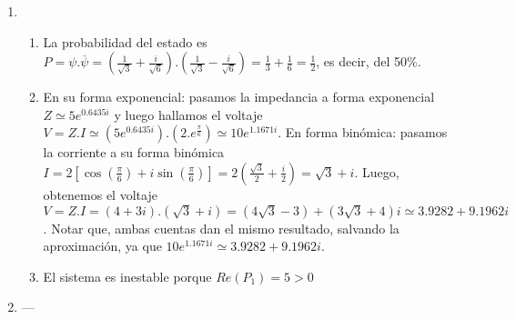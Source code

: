 \documentclass[a4paper]{article}
\newcommand{\exercise}{\item}
\newcommand{\df}[2]{\displaystyle\frac{#1}{#2}}
\newcommand{\conj}[1]{\overline{#1}}
\newcommand{\cis}[1]{\left[\cos\left({#1}\right)+i\sin\left({#1}\right)\right]}
\begin{document}
\begin{enumerate}
\begin{enumerate} [label=(\alph*)]
\item ---		\item Primero rotamos los puntos $90^{\circ}$ en sentido antihorario con la operación $w=z.e^{\frac{\pi}{2}i}=z.i$. Luego expandimos los puntos obtenidos con la operación $u=2.z.i=2i.z$. Los nuevos puntos obtenidos serán $a=-2$, $b=2i-2$, $c=0$ y $d=2i$.
		\item Notar que $Arg(z) = 60^{\circ}$ y queremos rotarlo para que esté orientado hace el eje $-x$, por lo que deberíamos rotarlo $120^{\circ}=\df{2}{3}\pi$. Para rotarlo debemos hacer la operación $w=z.e^{\frac{2\pi}{3}i} = \left(2e^{\frac{\pi}{3}i}\right).e^{\frac{2\pi}{3}i} =2e^{\pi i}=-2+0i$, que está exactamente al centro de la región pedida.
		\item Podemos escalar al complejo con la operación $u=kz=k+4ki$. Si queremos que se cumpla la condición límite $Im(u) = 2 - Re(u)$ debe pasar que $4k=2-k$, es decir, $k=2/5$. Por lo tanto, podremos utilizar valores de $k$ entre $0$ y $\df{2}{5}$. Se sugiere elegir algunos valores de $k$ para escalar al complejo y graficarlo junto con la región pedida.
		\item Notar que $Arg(3+i) \simeq 18.43^{\circ}$ y queremos rotarlo para que esté orientado hace el eje $-x$, por lo que deberíamos rotarlo alrededor de $160^{\circ}=\df{8}{9}\pi$ (no hace falta ser exactos ya que hay toda un área donde el complejo puede caer). Para rotarlo debemos hacer la operación $w=z.e^{\frac{8\pi}{9}i}\simeq \left(\sqrt{10}e^{0.3218 i}\right).e^{\frac{8\pi}{9}i}\simeq \sqrt{10}e^{3.1143 i} \simeq -3.1611 + 0.0864 i$, que gráficamente puede verse que comprueba lo pedido.
\end{enumerate}\exercise\begin{enumerate} [label=(\alph*)]		\item La probabilidad del estado es $P=\psi .\conj{\psi}=\left(\df{1}{\sqrt{3}}+\df{i}{\sqrt{6}}\right).\left(\df{1}{\sqrt{3}}-\df{i}{\sqrt{6}}\right)=\df{1}{3}+\df{1}{6}=\df{1}{2}$, es decir, del 50\%.
		\item En su forma exponencial: pasamos la impedancia a forma exponencial $Z \simeq 5e^{0.6435 i}$ y luego hallamos el voltaje $V=Z.I\simeq\left(5e^{0.6435 i}\right).\left(2.e^{\frac{\pi}{6}}\right)\simeq10e^{1.1671 i}$. En forma binómica: pasamos la corriente a su forma binómica $I=2\cis{\df{\pi}{6}}=2\left(\df{\sqrt{3}}{2}+\df{i}{2}\right)=\sqrt{3}+i$. Luego, obtenemos el voltaje $V=Z.I=(4+3i).(\sqrt{3}+i)=(4\sqrt{3}-3)+(3\sqrt{3}+4)i\simeq 3.9282 + 9.1962 i$. Notar que, ambas cuentas dan el mismo resultado, salvando la aproximación, ya que $10e^{1.1671 i} \simeq 3.9282 + 9.1962 i$.
		\item El sistema es inestable porque $Re(P_1)=5>0$
\end{enumerate}\exercise---\end{enumerate}
\end{document}
